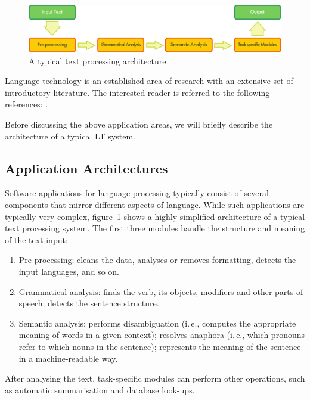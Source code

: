 \documentclass[]{../../metanetpaper}
\begin{document}
\begin{multicols}{2}
\begin{figure}[b]
  \center
  \includegraphics[width=\textwidth]{../_media/english/text_processing_app_architecture}
  \caption{A typical text processing architecture}
  \label{fig:textprocessingarch_en}
\end{figure}

Language technology is an established area of research with an extensive set of introductory literature. The interested reader is referred to the following references:  \cite{carstensen-etal1, jurafsky-martin01, manning-schuetze1, lt-world1, lt-survey1}.

Before discussing the above application areas, we will briefly describe the architecture of a typical LT system.

\subsection{Application Architectures}

Software applications for language processing typically consist of several components that mirror different aspects of language. While such applications are typically very complex, figure~\ref{fig:textprocessingarch_en} shows a highly simplified architecture of a typical text processing system. The first three modules handle the structure and meaning of the text input:

\begin{enumerate}
\item Pre-processing: cleans the data, analyses or removes formatting, detects the input languages, and so on.
\item Grammatical analysis: finds the verb, its objects, modifiers and other parts of speech; detects the sentence structure.
\item Semantic analysis: performs disambiguation (i.\,e., computes the appropriate meaning of words in a given context); resolves anaphora (i.\,e., which pronouns refer to which nouns in the sentence); represents the meaning of the sentence in a machine-readable way.
\end{enumerate}

After analysing the text, task-specific modules can perform other operations, such as automatic summarisation and database look-ups.


\end{multicols}
\end{document}
